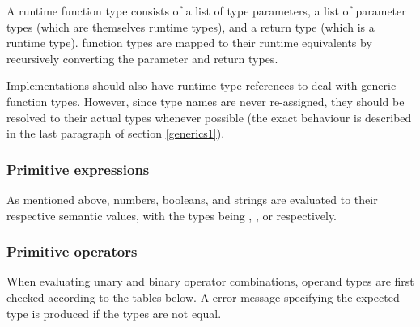 A runtime function type consists of a list of type parameters, a list of parameter types (which are themselves runtime types), and a return type (which is a runtime type).
\DynamicTS{} function types are mapped to their runtime equivalents by recursively converting the parameter and return types. 

Implementations should also have runtime type references to deal with generic function types.
However, since type names are never re-assigned, they should be resolved to their actual types whenever possible (the exact behaviour is described in the last paragraph of section \ref{generics1}).

\subsubsection*{Primitive expressions}

As mentioned above, numbers, booleans, and strings are evaluated to their respective semantic values, with the types being , , or  respectively.

\subsubsection*{Primitive operators}

When evaluating unary and binary operator combinations, 
operand types are first checked according to the tables below.
A error message specifying the expected type is produced if the types are not equal.

